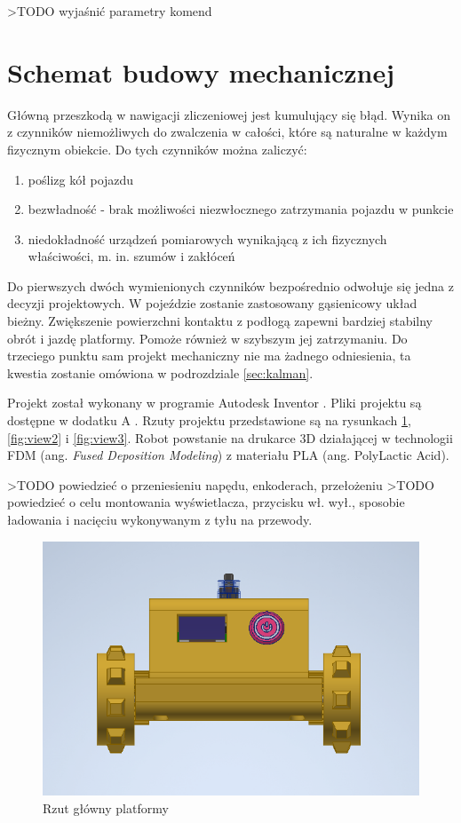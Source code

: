 >TODO wyjaśnić parametry komend

\section{Schemat budowy mechanicznej}
Główną przeszkodą w nawigacji zliczeniowej jest kumulujący się błąd. Wynika on z czynników niemożliwych do zwalczenia w całości, które są naturalne w każdym fizycznym obiekcie. Do tych czynników można zaliczyć: 
\begin{enumerate}
    \item poślizg kół pojazdu
    \item bezwładność - brak możliwości niezwłocznego zatrzymania pojazdu w punkcie
    \item niedokładność urządzeń pomiarowych wynikającą z ich fizycznych właściwości, m. in. szumów i zakłóceń
\end{enumerate}

Do pierwszych dwóch wymienionych czynników bezpośrednio odwołuje się jedna z decyzji projektowych. W pojeździe zostanie zastosowany gąsienicowy układ bieżny. Zwiększenie powierzchni kontaktu z podłogą zapewni bardziej stabilny obrót i jazdę platformy. Pomoże również w szybszym jej zatrzymaniu. Do trzeciego punktu sam projekt mechaniczny nie ma żadnego odniesienia, ta kwestia zostanie omówiona w podrozdziale \ref{sec:kalman}.

Projekt został wykonany w programie Autodesk Inventor \cite{inventor}. Pliki projektu są dostępne w dodatku A \label{sec:disc-addon}. Rzuty projektu przedstawione są na rysunkach \ref{fig:view1}, \ref{fig:view2} i \ref{fig:view3}. Robot powstanie na drukarce 3D działającej w technologii FDM (ang. \emph{Fused Deposition Modeling}) z materiału PLA (ang. PolyLactic Acid).

>TODO powiedzieć o przeniesieniu napędu, enkoderach, przełożeniu
>TODO powiedzieć o celu montowania wyświetlacza, przycisku wł. wył., sposobie ładowania i nacięciu wykonywanym z tyłu na przewody.


\begin{figure}[H]
	\centering
		\includegraphics[width=0.5\linewidth]{rys/view1.png}
	\caption{Rzut główny platformy}
	\label{fig:view1}
\end{figure}

